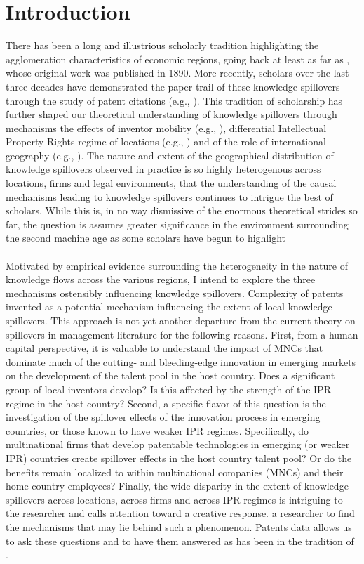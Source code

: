 \documentclass[12pt]{article}
\begin{document}
\section{Introduction}
There has been a long and illustrious scholarly tradition highlighting the agglomeration characteristics of economic regions, going back at least as far as \cite{Marshall1890}, whose original work was published in 1890. More recently, scholars over the last three decades have demonstrated the paper trail of these knowledge spillovers through the study of patent citations (e.g., \cite{Jaffe1993, Almeida1999}). This tradition of scholarship has further shaped our theoretical understanding of knowledge spillovers through mechanisms  the effects of inventor mobility (e.g., \cite{Almeida1999}), differential Intellectual Property Rights regime of locations (e.g., \cite{Zhao2006}) and of the role of international geography (e.g., \cite{Singh2007}).  The nature and extent of the geographical distribution of knowledge spillovers observed  in practice is so highly heterogenous across locations, firms and legal environments,  that the understanding of the causal mechanisms leading to knowledge spillovers continues to intrigue the best of scholars. While this is, in no way dismissive of  the enormous theoretical strides so far, the question is assumes greater significance in the environment surrounding the second machine age as some scholars have begun to highlight \citep{Mcafee2014} 
\\\\
Motivated by empirical evidence surrounding the heterogeneity in the nature of knowledge flows across the various regions, I intend to explore the three mechanisms ostensibly influencing knowledge spillovers. Complexity of patents invented as a potential mechanism influencing the extent of local knowledge spillovers. This approach is not yet another departure from the current theory on spillovers in management literature for the following reasons.  First, from a human capital perspective, it is valuable to understand the impact of MNCs that dominate much of the cutting- and bleeding-edge innovation in emerging markets on the development of the talent pool in the host country. Does a significant group of local inventors develop? Is this affected by the strength of the IPR regime in the host country? Second, a specific flavor of this question is the investigation of the spillover effects of the innovation process in emerging countries, or those known to have weaker IPR regimes. Specifically, do multinational firms that develop patentable technologies in emerging (or weaker IPR) countries create spillover effects in the host country talent pool? Or do the benefits remain localized to within multinational companies (MNCs) and their home country employees?  Finally, the wide disparity in the extent of knowledge spillovers across locations, across firms and across IPR regimes is intriguing to the researcher and calls attention toward a creative response.  a researcher to find the mechanisms that may lie behind such a phenomenon. Patents data allows us to ask these questions and to have them answered as has been in the tradition of \cite{Jaffe1993}.
\end{document}
